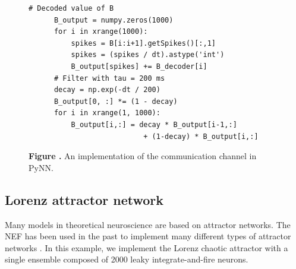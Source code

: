 \documentclass{frontiersSCNS}
\begin{document}
\begin{figure}
\begin{center}
\begin{minipage}{.495\textwidth}
\begin{lstlisting}[basicstyle={\footnotesize\ttfamily}]
      # Decoded value of B
      B_output = numpy.zeros(1000)
      for i in xrange(1000):
          spikes = B[i:i+1].getSpikes()[:,1]
          spikes = (spikes / dt).astype('int')
          B_output[spikes] += B_decoder[i]
      # Filter with tau = 200 ms
      decay = np.exp(-dt / 200)
      B_output[0, :] *= (1 - decay)
      for i in xrange(1, 1000):
          B_output[i,:] = decay * B_output[i-1,:]
                           + (1-decay) * B_output[i,:]
    \end{lstlisting}
  \end{minipage}
\end{center}
 \textbf{\label{fig:pynn} Figure .}{
   An implementation of the communication channel in PyNN.}
\end{figure}

\subsection{Lorenz attractor network}

Many models in theoretical neuroscience
are based on attractor networks.
The NEF has been used in the past
to implement many different types of
attractor networks \cite{TODO}.
In this example,
we implement the Lorenz chaotic attractor
with a single ensemble
composed of 2000 leaky integrate-and-fire neurons.
\end{document}
